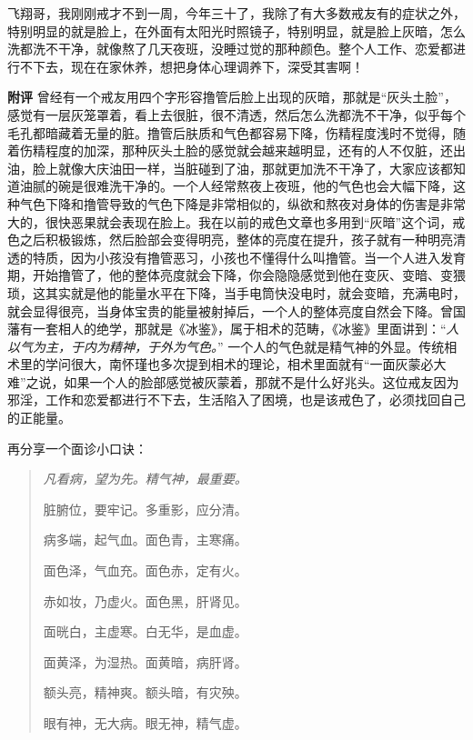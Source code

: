 \begin{case}
    飞翔哥，我刚刚戒才不到一周，今年三十了，我除了有大多数戒友有的症状之外，特别明显的就是脸上，在外面有太阳光时照镜子，特别明显，就是脸上灰暗，怎么洗都洗不干净，就像熬了几天夜班，没睡过觉的那种颜色。整个人工作、恋爱都进行不下去，现在在家休养，想把身体心理调养下，深受其害啊！

    \textbf{附评} 曾经有一个戒友用四个字形容撸管后脸上出现的灰暗，那就是“灰头土脸”，感觉有一层灰笼罩着，看上去很脏，很不清透，然后怎么洗都洗不干净，似乎每个毛孔都暗藏着无量的脏。撸管后肤质和气色都容易下降，伤精程度浅时不觉得，随着伤精程度的加深，那种灰头土脸的感觉就会越来越明显，还有的人不仅脏，还出油，脸上就像大庆油田一样，当脏碰到了油，那就更加洗不干净了，大家应该都知道油腻的碗是很难洗干净的。一个人经常熬夜上夜班，他的气色也会大幅下降，这种气色下降和撸管导致的气色下降是非常相似的，纵欲和熬夜对身体的伤害是非常大的，很快恶果就会表现在脸上。我在以前的戒色文章也多用到“灰暗”这个词，戒色之后积极锻炼，然后脸部会变得明亮，整体的亮度在提升，孩子就有一种明亮清透的特质，因为小孩没有撸管恶习，小孩也不懂得什么叫撸管。当一个人进入发育期，开始撸管了，他的整体亮度就会下降，你会隐隐感觉到他在变灰、变暗、变猥琐，这其实就是他的能量水平在下降，当手电筒快没电时，就会变暗，充满电时，就会显得很亮，当身体宝贵的能量被射掉后，一个人的整体亮度自然会下降。曾国藩有一套相人的绝学，那就是《冰鉴》，属于相术的范畴，《冰鉴》里面讲到：“\textit{人以气为主，于内为精神，于外为气色。}” 一个人的气色就是精气神的外显。传统相术里的学问很大，南怀瑾也多次提到相术的理论，相术里面就有“一面灰蒙必大难”之说，如果一个人的脸部感觉被灰蒙着，那就不是什么好兆头。这位戒友因为邪淫，工作和恋爱都进行不下去，生活陷入了困境，也是该戒色了，必须找回自己的正能量。

    再分享一个面诊小口诀：

    \begin{quotation}\it
        凡看病，望为先。精气神，最重要。

        脏腑位，要牢记。多重影，应分清。

        病多端，起气血。面色青，主寒痛。

        面色泽，气血充。面色赤，定有火。

        赤如妆，乃虚火。面色黑，肝肾见。

        面晄白，主虚寒。白无华，是血虚。

        面黄泽，为湿热。面黄暗，病肝肾。

        额头亮，精神爽。额头暗，有灾殃。

        眼有神，无大病。眼无神，精气虚。
    \end{quotation}
\end{case}

